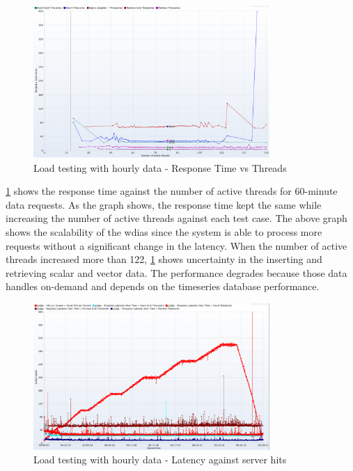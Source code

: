 \begin{figure}[htp]
    \centering
    \includegraphics[width=0.8\textwidth]{results/obs/all/obs_all_60m_response_times_vs_threads.png}
    \caption{Load testing with hourly data - Response Time vs Threads}
    \label{fi:test_obs_all_60m_response_vs_threads}
\end{figure}
\cref{fi:test_obs_all_60m_response_vs_threads} shows the response time against the number of active threads for 60-minute data requests. As the graph shows, the response time kept the same while increasing the number of active threads against each test case. The above graph shows the scalability of the \acrshort{wdias} since the system is able to process more requests without a significant change in the latency. When the number of active threads increased more than 122, \cref{fi:test_obs_all_60m_response_vs_threads} shows uncertainty in the inserting and retrieving scalar and vector data. The performance degrades because those data handles on-demand and depends on the timeseries database performance.

\begin{figure}[htp]
    \centering
    \includegraphics[width=0.8\textwidth]{results/obs/all/obs_all_60m_res_latencies_against_hits.png}
    \caption{Load testing with hourly data - Latency against server hits}
    \label{fi:test_obs_all_60m_latency}
\end{figure}

